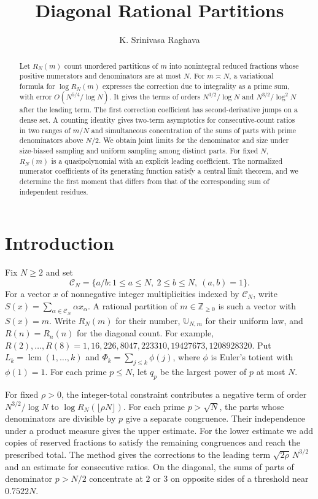 \documentclass[11pt]{amsart}
\title{Diagonal Rational Partitions}
\author{K. Srinivasa Raghava}
\theoremstyle{remark}
\DeclareMathOperator{\lcm}{lcm}
\newcommand{\Z}{\mathbb Z}
\begin{document}
\begin{abstract}
Let \(R_N(m)\) count unordered partitions of \(m\) into nonintegral reduced fractions whose positive numerators and denominators are at most \(N\). For \(m\asymp N\), a variational formula for \(\log R_N(m)\) expresses the correction due to integrality as a prime sum, with error \(O(N^{5/4}/\log N)\). It gives the terms of orders \(N^{3/2}/\log N\) and \(N^{3/2}/\log^2 N\) after the leading term. The first correction coefficient has second-derivative jumps on a dense set. A counting identity gives two-term asymptotics for consecutive-count ratios in two ranges of \(m/N\) and simultaneous concentration of the sums of parts with prime denominators above \(N/2\). We obtain joint limits for the denominator and size under size-biased sampling and uniform sampling among distinct parts. For fixed \(N\), \(R_N(m)\) is a quasipolynomial with an explicit leading coefficient. The normalized numerator coefficients of its generating function satisfy a central limit theorem, and we determine the first moment that differs from that of the corresponding sum of independent residues.
\end{abstract}
\maketitle

\section{Introduction}
Fix \(N\ge2\) and set
\[
 \mathcal C_N=\{a/b:1\le a\le N,\ 2\le b\le N,\ (a,b)=1\}.
\]
For a vector \(x\) of nonnegative integer multiplicities indexed by
\(\mathcal C_N\), write \(S(x)=\sum_{\alpha\in\mathcal C_N}\alpha x_\alpha\).
A rational partition of \(m\in\Z_{\ge0}\) is such a vector with \(S(x)=m\).
Write \(R_N(m)\) for their number, \(\mathbb U_{N,m}\) for their uniform
law, and \(R(n)=R_n(n)\) for the diagonal count. For example,
\(R(2),\ldots,R(8)=1,16,226,8047,223310,19427673,1208928320\).
Put \(L_k=\lcm(1,\ldots,k)\) and \(\Phi_k=\sum_{j\le k}\phi(j)\),
where \(\phi\) is Euler's totient with \(\phi(1)=1\). For each prime \(p\le N\),
let \(q_p\) be the largest power of \(p\) at most \(N\).

For fixed \(\rho>0\), the integer-total constraint contributes a negative
term of order \(N^{3/2}/\log N\) to \(\log R_N(\lfloor\rho N\rfloor)\).
For each prime \(p>\sqrt N\), the parts whose denominators are divisible
by \(p\) give a separate congruence. Their independence under a product
measure gives the upper estimate. For the lower estimate we add copies
of reserved fractions to satisfy the remaining congruences and reach
the prescribed total. The method gives the corrections to the leading
term \(\sqrt{2\rho}\,N^{3/2}\) and an estimate for consecutive ratios.
On the diagonal, the sums of parts of denominator \(p>N/2\) concentrate
at \(2\) or \(3\) on opposite sides of a threshold near \(0.7522N\).
\end{document}
